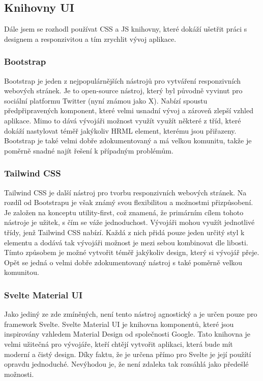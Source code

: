 \subsection{Knihovny UI}
Dále jsem se rozhodl používat CSS a JS knihovny, které dokáží ušetřit práci s designem a responzivitou a tím zrychlit vývoj aplikace.

\subsubsection*{Bootstrap}
Bootstrap je jeden z nejpopulárnějších nástrojů pro vytváření responzivních webových stránek. Je to open-source nástroj, který byl původně vyvinut pro sociální platformu Twitter (nyní známou jako X). Nabízí spoustu předpřipravených komponent, které velmi usnadní vývoj a zároveň zlepší vzhled aplikace. Mimo to dává vývojáři možnost využít využít některé z tříd, které dokáží nastylovat téměř jakýkoliv HRML element, kterému jsou přiřazeny. Bootstrap je také velmi dobře zdokumentovaný a má velkou komunitu, takže je poměrně snadné najít řešení k případným problémům.\cite{bootstrap,what_is_bootstrap}

\subsubsection*{Tailwind CSS}
Tailwind CSS je další nástroj pro tvorbu responzivních webových stránek. Na rozdíl od Bootstrapu je však známý svou flexibilitou a možnostmi přizpůsobení. Je založen na konceptu utility-first, což znamená, že primárním cílem tohoto nástroje je užitek, s čím se váže jednoduchost. Vývojáři mohou využít jednotlivé třídy, jenž Tailwind CSS nabízí. Každá z nich přidá pouze jeden určitý styl k elementu a dodává tak vývojáři možnost je mezi sebou kombinovat dle libosti. Tímto způsobem je možné vytvořit téměř jakýkoliv design, který si vývojář přeje. Opět se jedná o velmi dobře zdokumentovaný nástroj s také poměrně velkou komunitou.\cite{tailwind_css}

\subsubsection*{Svelte Material UI}
Jako jediný ze zde zmíněných, není tento nástroj agnostický a je určen pouze pro framework Svelte. Svelte Material UI je knihovna komponentů, které jsou inspirovány vzhledem Material Design od společnosti Google. Tato knihovna je velmi užitečná pro vývojáře, kteří chtějí vytvořit aplikaci, která bude mít moderní a čistý design. Díky faktu, že je určena přímo pro Svelte je její použítí opravdu jednoduché. Nevýhodou je, že není zdaleka tak rozsáhlá jako předešlé možnosti.\cite{svelte_material_ui}

